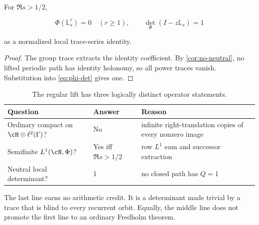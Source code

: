 \begin{corollary}
\label{cor:phi-one}
For \(\Re s>1/2\),

\[
 \Phi(\mathbb L_s^r)=0\quad(r\ge1),
 \qquad
 \det_\Phi(I-z\mathbb L_s)=1
\]

as a normalized local trace-series identity.
\end{corollary}

\begin{proof}
The group trace extracts the identity coefficient.  By
\cref{cor:no-neutral}, no lifted periodic path has identity holonomy, so all
power traces vanish.  Substitution into \cref{eq:phi-det} gives one.
\end{proof}

\begin{table}[t]
\centering
\small
\caption{The regular lift has three logically distinct operator statements.}
\label{tab:lift-distinction}
\begin{tabularx}{\textwidth}{L{0.25\textwidth}L{0.25\textwidth}Y}
\toprule
Question & Answer & Reason \\
\midrule
Ordinary compact on
\(\cH\otimes\ell^2(\Gamma)\)?
& No
& infinite right-translation copies of every nonzero image \\
Semifinite \(L^1(\cN,\Phi)\)?
& Yes iff \(\Re s>1/2\)
& row \(L^1\) sum and successor extraction \\
Neutral local determinant?
& \(1\)
& no closed path has \(Q=1\) \\
\bottomrule
\end{tabularx}
\end{table}

The last line earns no arithmetic credit.  It is a determinant made trivial
by a trace that is blind to every recurrent orbit.  Equally, the middle line
does not promote the first line to an ordinary Fredholm theorem.
